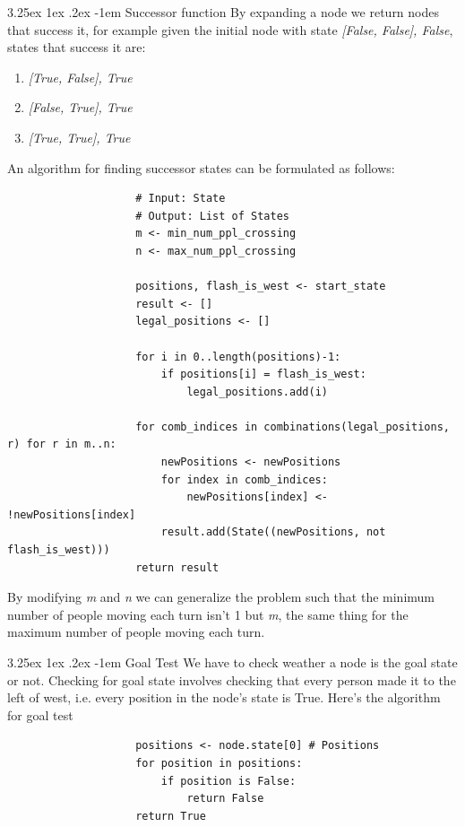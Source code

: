 \documentclass[12pt]{diazessay}
\makeatletter
\renewcommand\paragraph{\@startsection{paragraph}{5}{\z@}%
  {3.25ex \@plus1ex \@minus.2ex}%
  {-1em}%
  {\normalfont\normalsize\bfseries}}
\makeatother
\begin{document}
            \paragraph{Successor function}
                By expanding a node we return nodes that success it, for example given the initial node with state \textit{[False, False], False}, states that success it are:
                \begin{enumerate}
                    \item \textit{[True, False], True}
                    \item \textit{[False, True], True}
                    \item \textit{[True, True], True}
                \end{enumerate}
                An algorithm for finding successor states can be formulated as follows:
                \begin{lstlisting}
                    # Input: State
                    # Output: List of States
                    m <- min_num_ppl_crossing
                    n <- max_num_ppl_crossing
            
                    positions, flash_is_west <- start_state
                    result <- []
                    legal_positions <- []
            
                    for i in 0..length(positions)-1:
                        if positions[i] = flash_is_west:
                            legal_positions.add(i)
            
                    for comb_indices in combinations(legal_positions, r) for r in m..n:
                        newPositions <- newPositions
                        for index in comb_indices:
                            newPositions[index] <- !newPositions[index]
                        result.add(State((newPositions, not flash_is_west)))
                    return result
                \end{lstlisting}
                By modifying \textit{m} and \textit{n} we can generalize the problem such that the minimum number of people moving each turn isn't 1 but \textit{m}, the same thing for the maximum number of people moving each turn.

            \paragraph{Goal Test}
                We have to check weather a node is the goal state or not. Checking for goal state involves checking that every person made it to the left of west, i.e. every position in the node's state is True. Here's the algorithm for goal test
                \begin{lstlisting}
                    positions <- node.state[0] # Positions
                    for position in positions:
                        if position is False:
                            return False
                    return True
                \end{lstlisting}
\end{document}
